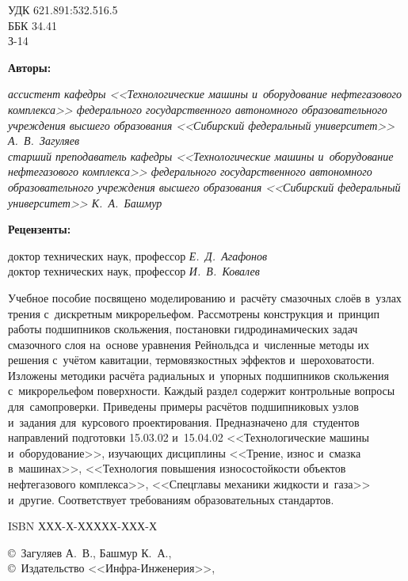 
\noindent УДК 621.891:532.516.5\\
ББК 34.41\\
З-14

\vspace{1cm}

\noindent\textbf{Авторы:}\\[0.3em]
\begin{center}
\textit{ассистент кафедры <<Технологические машины и~оборудование нефтегазового комплекса>> федерального государственного автономного образовательного учреждения высшего образования <<Сибирский федеральный университет>> А.~В.~Загуляев}\\[0.3em]
\textit{старший преподаватель кафедры <<Технологические машины и~оборудование нефтегазового комплекса>> федерального государственного автономного образовательного учреждения высшего образования <<Сибирский федеральный университет>> К.~А.~Башмур}
\end{center}

\vspace{0.5cm}

\noindent\textbf{Рецензенты:}\\[0.3em]
\begin{center}
доктор технических наук, профессор \textit{Е.~Д.~Агафонов}\\
доктор технических наук, профессор \textit{И.~В.~Ковалев}
\end{center}

\vspace{1cm}

Учебное пособие посвящено моделированию и~расчёту смазочных слоёв в~узлах трения с~дискретным микрорельефом. Рассмотрены конструкция и~принцип работы подшипников скольжения, постановки гидродинамических задач смазочного слоя на~основе уравнения Рейнольдса и~численные методы их решения с~учётом кавитации, термовязкостных эффектов и~шероховатости. Изложены методики расчёта радиальных и~упорных подшипников скольжения с~микрорельефом поверхности. Каждый раздел содержит контрольные вопросы для~самопроверки. Приведены примеры расчётов подшипниковых узлов и~задания для~курсового проектирования. Предназначено для~студентов направлений подготовки 15.03.02 и~15.04.02 <<Технологические машины и~оборудование>>, изучающих дисциплины <<Трение, износ и~смазка в~машинах>>, <<Технология повышения износостойкости объектов нефтегазового комплекса>>, <<Спецглавы механики жидкости и~газа>> и~другие. Соответствует требованиям образовательных стандартов.

\vspace{\baselineskip}

\noindent ISBN ХХХ-Х-ХХХХХ-ХХХ-Х

\vfill

\vspace{0.3cm}

\begin{flushright}
\copyright~Загуляев А.~В., Башмур К.~А., \the\year\\
\copyright~Издательство <<Инфра-Инженерия>>, \the\year
\end{flushright}

\newpage

